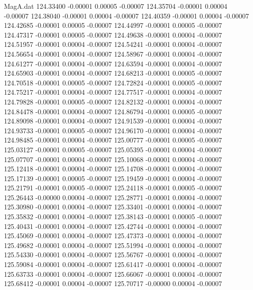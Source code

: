 \begin{filecontents}{MagA.dat}
 124.33400   -0.00001    0.00005   -0.00007
 124.35704   -0.00001    0.00004   -0.00007
 124.38040   -0.00001    0.00004   -0.00007
 124.40359   -0.00001    0.00004   -0.00007
 124.42685   -0.00001    0.00005   -0.00007
 124.44997   -0.00001    0.00005   -0.00007
 124.47317   -0.00001    0.00005   -0.00007
 124.49638   -0.00001    0.00004   -0.00007
 124.51957   -0.00001    0.00004   -0.00007
 124.54241   -0.00001    0.00004   -0.00007
 124.56654   -0.00001    0.00004   -0.00007
 124.58967   -0.00001    0.00004   -0.00007
 124.61277   -0.00001    0.00004   -0.00007
 124.63594   -0.00001    0.00004   -0.00007
 124.65903   -0.00001    0.00004   -0.00007
 124.68213   -0.00001    0.00005   -0.00007
 124.70518   -0.00001    0.00005   -0.00007
 124.72824   -0.00001    0.00005   -0.00007
 124.75217   -0.00001    0.00004   -0.00007
 124.77517   -0.00001    0.00004   -0.00007
 124.79828   -0.00001    0.00005   -0.00007
 124.82132   -0.00001    0.00004   -0.00007
 124.84478   -0.00001    0.00004   -0.00007
 124.86794   -0.00001    0.00005   -0.00007
 124.89098   -0.00001    0.00004   -0.00007
 124.91539   -0.00001    0.00004   -0.00007
 124.93733   -0.00001    0.00005   -0.00007
 124.96170   -0.00001    0.00004   -0.00007
 124.98485   -0.00001    0.00004   -0.00007
 125.00777   -0.00001    0.00005   -0.00007
 125.03127   -0.00001    0.00005   -0.00007
 125.05395   -0.00001    0.00004   -0.00007
 125.07707   -0.00001    0.00004   -0.00007
 125.10068   -0.00001    0.00004   -0.00007
 125.12418   -0.00001    0.00004   -0.00007
 125.14708   -0.00001    0.00004   -0.00007
 125.17139   -0.00001    0.00005   -0.00007
 125.19459   -0.00001    0.00004   -0.00007
 125.21791   -0.00001    0.00005   -0.00007
 125.24118   -0.00001    0.00005   -0.00007
 125.26443   -0.00000    0.00004   -0.00007
 125.28771   -0.00001    0.00004   -0.00007
 125.30980   -0.00001    0.00004   -0.00007
 125.33401   -0.00001    0.00004   -0.00007
 125.35832   -0.00001    0.00004   -0.00007
 125.38143   -0.00001    0.00005   -0.00007
 125.40431   -0.00001    0.00004   -0.00007
 125.42744   -0.00001    0.00004   -0.00007
 125.45069   -0.00001    0.00004   -0.00007
 125.47373   -0.00001    0.00004   -0.00007
 125.49682   -0.00001    0.00004   -0.00007
 125.51994   -0.00001    0.00004   -0.00007
 125.54330   -0.00001    0.00004   -0.00007
 125.56767   -0.00001    0.00004   -0.00007
 125.59084   -0.00001    0.00004   -0.00007
 125.61417   -0.00001    0.00004   -0.00007
 125.63733   -0.00001    0.00004   -0.00007
 125.66067   -0.00001    0.00004   -0.00007
 125.68412   -0.00001    0.00004   -0.00007
 125.70717   -0.00000    0.00004   -0.00007

\end{filecontents}
